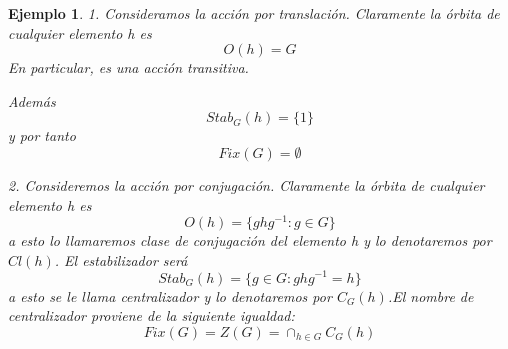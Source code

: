 \documentclass{article}
\theoremstyle{theorem-style}  %
\theoremstyle{definition-style}
\theoremstyle{example-style}
\newtheorem{example}{Ejemplo}[section]
\begin{document}
\begin{example}
1. Consideramos la acción por translación. Claramente la órbita de cualquier elemento h es $$O(h) = G$$ En particular, es una acción transitiva. 

Además $$Stab_G(h) = \{1\}$$ y por tanto $$Fix(G) = \emptyset$$

2. Consideremos la acción por conjugación. Claramente la órbita de cualquier elemento h es $$O(h) = \{ghg^{-1}:g \in G\}$$ a esto lo llamaremos clase de conjugación del elemento h y lo denotaremos por $Cl(h)$. El estabilizador será $$Stab_G(h) = \{g \in G:ghg^{-1}  = h\}$$ a esto se le llama centralizador y lo denotaremos por $C_G(h)$.El nombre de centralizador proviene de la siguiente igualdad: $$Fix(G) = Z(G) = \cap_{h \in G} C_G(h)$$ 
 \end{example}


\printbibliography
\end{document}
